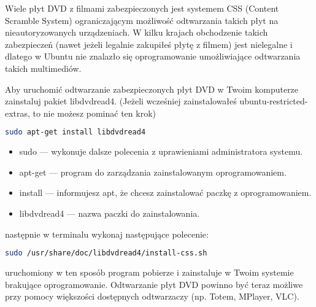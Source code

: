 Wiele płyt DVD z filmami zabezpieczonych jest systemem CSS (Content Scramble System) ograniczającym możliwość odtwarzania takich płyt na nieautoryzowanych urządzeniach. W kilku krajach obchodzenie takich zabezpieczeń (nawet jeżeli legalnie zakupiłeś płytę z filmem) jest nielegalne i dlatego w Ubuntu nie znalazło się oprogramowanie umożliwiające odtwarzania takich multimediów.

Aby uruchomić odtwarzanie zabezpieczonych płyt DVD w Twoim komputerze zainstaluj pakiet \textcolor{ubuntu_orange}{libdvdread4}. (Jeżeli wcześniej zainstalowałeś ubuntu-restricted-extras, to nie możesz pominać ten krok)
\begin{lstlisting}[language=bash]
sudo apt-get install libdvdread4
\end{lstlisting}
\begin{itemize}
\item \textcolor{ubuntu_orange}{sudo} --- wykonuje dalsze polecenia z uprawieniami administratora systemu.
\item \textcolor{ubuntu_orange}{apt-get} --- program do zarządzania zainstalowanym oprogramowaniem.
\item \textcolor{ubuntu_orange}{install} --- informujesz apt, że chcesz zainstalować paczkę z oprogramowaniem.
\item \textcolor{ubuntu_orange}{libdvdread4} --- nazwa paczki do zainstalowania.
\end{itemize}

następnie w terminalu wykonaj następujące polecenie:
\begin{lstlisting}[language=bash]
sudo /usr/share/doc/libdvdread4/install-css.sh
\end{lstlisting}
uruchomiony w ten sposób program pobierze i zainstaluje w Twoim systemie brakujące oprogramowanie. Odtwarzanie płyt DVD powinno być teraz możliwe przy pomocy większości dostępnych odtwarzaczy (np. Totem, MPlayer, VLC).